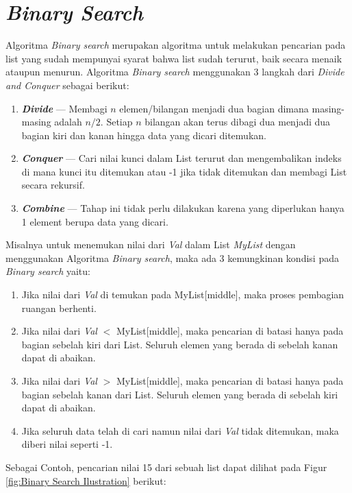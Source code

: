 \documentclass[12pt]{book}%
\begin{document}
\section{\textit{Binary Search}}
Algoritma \textit{Binary search}  merupakan  algoritma untuk melakukan pencarian pada list yang sudah mempunyai syarat bahwa list sudah terurut, baik secara menaik ataupun menurun. Algoritma \textit{Binary search} menggunakan 3 langkah dari \textit{Divide and Conquer} sebagai berikut:
\begin{enumerate}
\item \textbf{\textit{Divide}} --- Membagi $n$ elemen/bilangan menjadi dua bagian dimana masing-masing adalah $n/2$. Setiap $n$ bilangan akan terus dibagi dua menjadi dua bagian kiri dan kanan hingga data yang dicari ditemukan.
\item \textbf{\textit{Conquer}} --- Cari nilai kunci dalam  List terurut dan mengembalikan indeks di mana kunci itu ditemukan atau -1 jika tidak ditemukan dan membagi List secara rekursif.
\item \textbf{\textit{Combine}} --- Tahap ini tidak perlu dilakukan karena yang diperlukan hanya 1 element berupa data yang dicari.
\end{enumerate}

 Misalnya untuk menemukan nilai dari \textit{Val}  dalam List \textit{MyList} dengan menggunakan Algoritma \textit{Binary search}, maka ada 3 kemungkinan kondisi pada \textit{Binary search} yaitu:
\begin{enumerate}
  \item Jika nilai dari \textit{Val} di temukan pada MyList[middle], maka proses pembagian ruangan berhenti. 
  \item Jika nilai dari \textit{Val} $<$ MyList[middle], maka pencarian di batasi hanya pada bagian sebelah kiri dari List. Seluruh elemen yang berada di sebelah kanan dapat di abaikan.
  \item Jika nilai dari \textit{Val} $>$ MyList[middle], maka pencarian di batasi hanya pada bagian sebelah kanan dari List. Seluruh elemen yang berada di sebelah kiri dapat di abaikan.
  \item Jika seluruh data telah di cari namun nilai dari \textit{Val} tidak ditemukan, maka diberi nilai seperti -1.
\end{enumerate}

Sebagai Contoh, pencarian nilai 15 dari sebuah list dapat dilihat pada Figur \ref{fig:Binary Search Ilustration} berikut:
\end{document}
